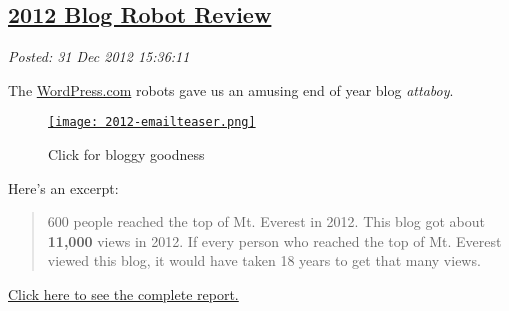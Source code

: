 %

\subsection*{\href{http://bakerjd99.wordpress.com/2012/12/31/2012-blog-robot-review/}{2012 Blog Robot Review}}


\noindent\emph{Posted: 31 Dec 2012 15:36:11}
\vspace{6pt}

The \href{http://wordpress.com/}{WordPress.com} robots gave us an amusing end of year blog
\emph{attaboy}.

\captionsetup[figure]{labelformat=empty}
\begin{figure}[htbp]
\centering
\href{http://bakerjd99.wordpress.com/2012/annual-report/}{\texttt{[image: 2012-emailteaser.png]}}
\caption{Click for bloggy goodness}
\label{fig:3653X0}
\end{figure}


Here's an excerpt:

\begin{quote}
600 people reached the top of Mt. Everest in 2012. This blog got about
\textbf{11,000} views in 2012. If every person who reached the top of
Mt. Everest viewed this blog, it would have taken 18 years to get that
many views.
\end{quote}

\href{http://bakerjd99.wordpress.com/2012/annual-report/}{Click here to
see the complete report.}




%